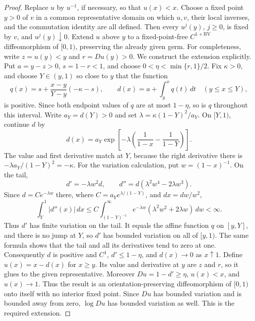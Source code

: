 \documentclass[11pt]{article}
\theoremstyle{definition}
\theoremstyle{remark}
\begin{document}
\begin{proof}
Replace \(u\) by \(u^{-1}\), if necessary, so that \(u(x)<x\).  Choose a
fixed point \(y>0\) of \(v\) in a common representative domain on which
\(u,v\), their local inverses, and the commutation identity are all defined.
Then every
\(u^j(y)\), \(j\geq0\), is fixed by \(v\), and \(u^j(y)\downarrow0\).
Extend \(u\) above \(y\) to a fixed-point-free
\(C^{1+\mathrm{BV}}\) diffeomorphism of \([0,1)\), preserving the already
given germ.  For completeness, write \(z=u(y)<y\) and \(r=Du(y)>0\).
We construct the extension explicitly.  Put \(a=y-z>0\),
\(s=1-r<1\), and choose
\(0<\eta<\min\{r,1\}/2\).  Fix \(\kappa>0\), and choose
\(Y\in(y,1)\) so close to \(y\) that the function
\[
 q(x)=s+\frac{x-y}{Y-y}(-\kappa-s),\qquad
 d(x)=a+\int_y^x q(t)\,dt \quad (y\leq x\leq Y),
\]
is positive.  Since both endpoint values of \(q\) are at most
\(1-\eta\), so is \(q\) throughout this interval.  Write
\(a_Y=d(Y)>0\) and set
\(\lambda=\kappa(1-Y)^2/a_Y\).  On \([Y,1)\), continue \(d\) by
\[
 d(x)=a_Y\exp\!\left[-\lambda
   \left(\frac1{1-x}-\frac1{1-Y}\right)\right].
\]
The value and first derivative match at \(Y\), because the right derivative
there is \(-\lambda a_Y/(1-Y)^2=-\kappa\).  For the variation calculation,
put \(w=(1-x)^{-1}\).  On the tail,
\[
 d'=-\lambda w^2d,\qquad
 d''=d(\lambda^2w^4-2\lambda w^3).
\]
Since \(d=C e^{-\lambda w}\) there, where
\(C=a_Ye^{\lambda/(1-Y)}\), and \(dx=dw/w^2\),
\[
 \int_Y^1|d''(x)|\,dx
 \leq C\int_{(1-Y)^{-1}}^\infty
 e^{-\lambda w}(\lambda^2w^2+2\lambda w)\,dw<\infty.
\]
Thus \(d'\) has finite variation on the tail.  It equals the affine
function \(q\) on \([y,Y]\), and there is no jump at \(Y\), so \(d'\) has
bounded variation on all of \([y,1)\).  The same formula shows that the tail
and all its derivatives tend to zero at one.  Consequently \(d\) is positive
and \(C^1\), \(d'\leq1-\eta\), and \(d(x)\to0\) as \(x\uparrow1\).  Define
\(u(x)=x-d(x)\) for \(x\geq y\).
Its value and derivative at \(y\) are \(z\) and \(r\), so it glues to the
given representative.  Moreover \(Du=1-d'\geq\eta\), \(u(x)<x\), and
\(u(x)\to1\).  Thus the result is an orientation-preserving diffeomorphism
of \([0,1)\) onto itself with no interior fixed point.  Since \(Du\) has
bounded variation and is bounded away from zero, \(\log Du\) has bounded
variation as well.  This is the required extension.


\end{proof}
\end{document}
